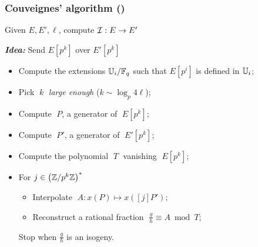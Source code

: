 \documentclass[10pt,usepdftitle=false]{beamer}
\begin{document}

\begin{frame}
  \frametitle{Couveignes' algorithm (\cite{couveignes96})}
  
  \begin{center}
    \large
    Given $E, E', \ell$, compute $\mathcal{I}:E\to E'$
  \end{center}

  \begin{center}
    \emph{\textbf{Idea:}} Send $E[p^k]$ over $E'[p^k]$
  \end{center}
  
  \begin{itemize}
  \item Compute the extensions $\mathbb{U}_i/\mathbb{F}_q$ such that $E[p^i]$ is
    defined in $\mathbb{U}_i$;
  \item Pick $\;k\;$ \emph{large enough} ($k\sim\log_p4\ell$);
  \item Compute $\;P$, a generator of $\;E[p^k]$;
  \item Compute $\;P'$, a generator of $\;E'[p^k]$;
  \item Compute the polynomial $\;T\;$ vanishing $\;E[p^k]$;
  \item For $j\in\left(\mathbb{Z}/p^k\mathbb{Z}\right)^\ast$
    \begin{itemize}
      \normalsize
    \item Interpolate $\;A : x(P) \mapsto x([j]P')$;
    \item Reconstruct a rational fraction  $\;\frac{g}{h}\equiv A \bmod T$;
    \end{itemize}
    \alert<4>{Stop when $\frac{g}{h}$ is an isogeny.}
  \end{itemize}
\end{frame}

\end{document}
